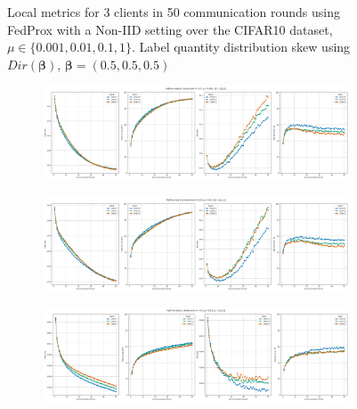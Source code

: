 \begin{figure}[H]
    \caption{Local metrics for 3 clients in 50 communication rounds using FedProx with a Non-IID setting over the CIFAR10 dataset, $\mu \in \{0.001, 0.01, 0.1, 1\}$.  Label quantity distribution skew using $Dir(\boldsymbol{\beta})$, $\boldsymbol{\beta} = (0.5,0.5,0.5)$  }
    \label{fig:FedProx_Non_IID_LabelQuantitySkeqDir_05}
\end{figure}




\begin{figure}[H]
    \centering

    \begin{subfigure}{\linewidth}
        \centering
        \includegraphics[width=0.8\linewidth]{figures/2-Federated_Learning/FedProx_NoiseLevel_Mu_0.001.png}
    \end{subfigure}
    \vspace{1em} %

    \begin{subfigure}{\linewidth}
        \centering
        \includegraphics[width=0.8\linewidth]{figures/2-Federated_Learning/FedProx_NoiseLevel_Mu_0.01.png}
    \end{subfigure}
    \vspace{1em} %

    \begin{subfigure}{\linewidth}
        \centering
        \includegraphics[width=0.8\linewidth]{figures/2-Federated_Learning/FedProx_NoiseLevel_Mu_0.1.png}
    \end{subfigure}
    \vspace{1em} %


\end{figure}
